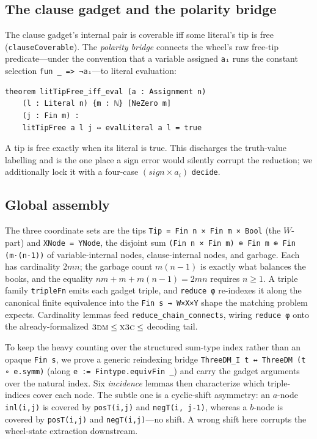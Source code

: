 \documentclass[sigplan,review,anonymous]{acmart}
\begin{document}
\subsection{The clause gadget and the polarity bridge}\label{sec:clause}

The clause gadget's internal pair is coverable iff some literal's tip is free (\lstinline{clauseCoverable}).
The \emph{polarity bridge} connects the wheel's raw free-tip predicate---under the convention that a variable
assigned \lstinline{aᵢ} runs the constant selection \lstinline{fun _ => ¬aᵢ}---to literal evaluation:
\begin{lstlisting}[style=leandisplay]
theorem litTipFree_iff_eval (a : Assignment n)
    (l : Literal n) {m : ℕ} [NeZero m]
    (j : Fin m) :
    litTipFree a l j ↔ evalLiteral a l = true
\end{lstlisting}
A tip is free exactly when its literal is true. This discharges the truth-value labelling and is the one place
a sign error would silently corrupt the reduction; we additionally lock it with a four-case
$(\mathit{sign} \times a_i)$ \lstinline{decide}.

\subsection{Global assembly}\label{sec:assembly}

The three coordinate sets are the tips \lstinline{Tip = Fin n × Fin m × Bool} (the $W$-part) and
\lstinline{XNode = YNode}, the disjoint sum \lstinline{(Fin n × Fin m) ⊕ Fin m ⊕ Fin (m·(n-1))} of
variable-internal nodes, clause-internal nodes, and garbage. Each has cardinality $2mn$; the garbage count
$m(n{-}1)$ is exactly what balances the books, and the equality $n m + m + m(n{-}1) = 2mn$ requires $n \ge 1$.
A triple family \lstinline{tripleFn} emits each gadget triple, and \lstinline{reduce φ} re-indexes it along the
canonical finite equivalence into the \lstinline{Fin s → W×X×Y} shape the matching problem expects.
Cardinality lemmas feed \lstinline{reduce_chain_connects}, wiring \lstinline{reduce φ} onto the
already-formalized $\textsc{3dm} \le \textsc{x3c} \le$ decoding tail.

To keep the heavy counting over the structured sum-type index rather than an opaque \lstinline{Fin s}, we prove
a generic reindexing bridge \lstinline{ThreeDM_I t ↔ ThreeDM (t ∘ e.symm)} (along
\lstinline{e := Fintype.equivFin _}) and carry the gadget arguments over the natural index. Six \emph{incidence}
lemmas then characterize which triple-indices cover each node. The subtle one is a cyclic-shift asymmetry: an
$a$-node \lstinline{inl(i,j)} is covered by \lstinline{posT(i,j)} and \lstinline{negT(i, j-1)}, whereas a
$b$-node is covered by \lstinline{posT(i,j)} and \lstinline{negT(i,j)}---no shift. A wrong shift here corrupts
the wheel-state extraction downstream.
\end{document}
